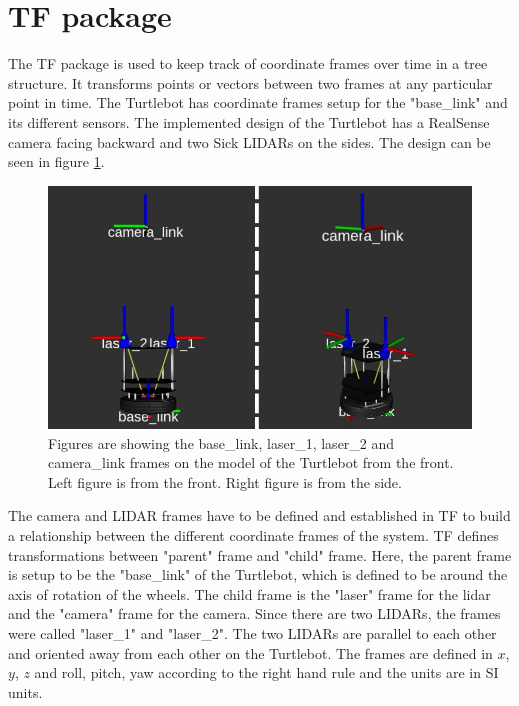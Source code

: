 \section{TF package} \label{sec:tf_package}
The TF package is used to keep track of coordinate frames over time in a tree structure. It transforms points or vectors between two frames at any particular point in time. The Turtlebot has coordinate frames setup for the "base\_link" and its different sensors. The implemented design of the Turtlebot has a RealSense camera facing backward and two Sick LIDARs on the sides. The design can be seen in figure \ref{fig:robot_tf}.

\begin{figure}[H]
    \centering
    \includegraphics[width=\textwidth]{figures/robotTF.png}
    \caption{Figures are showing the base\_link, laser\_1, laser\_2 and camera\_link frames on the model of the Turtlebot from the front. Left figure is from the front. Right figure is from the side.}
    \label{fig:robot_tf}
\end{figure}

The camera and LIDAR frames have to be defined and established in TF to build a relationship between the different coordinate frames of the system. TF defines transformations between "parent" frame and "child" frame. Here, the parent frame is setup to be the "base\_link" of the Turtlebot, which is defined to be around the axis of rotation of the wheels. The child frame is the "laser" frame for the lidar and the "camera" frame for the camera. Since there are two LIDARs, the frames were called "laser\_1" and "laser\_2". The two LIDARs are parallel to each other and oriented away from each other on the Turtlebot. The frames are defined in $x$, $y$, $z$ and roll, pitch, yaw according to the right hand rule and the units are in SI units.


